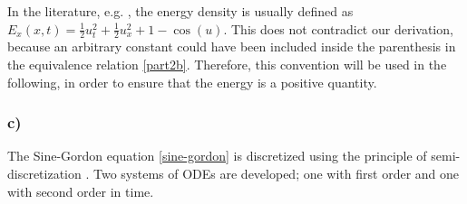 In the literature, e.g. \cite{SG-energy}, the energy density is usually defined as $E_x(x,t) = \frac{1}{2}u_t^2 + \frac{1}{2}u_x^2 + 1 - \cos{(u)}$. This does not contradict our derivation, because an arbitrary constant could have been included inside the parenthesis in the equivalence relation \eqref{part2b}. Therefore, this convention will be used in the following, in order to ensure that the energy is a positive quantity. 

\subsubsection*{c)}
The Sine-Gordon equation \eqref{sine-gordon} is discretized using the principle of semi-discretization \cite{Owren}. Two systems of ODEs are developed; one with first order and one with second order in time.


